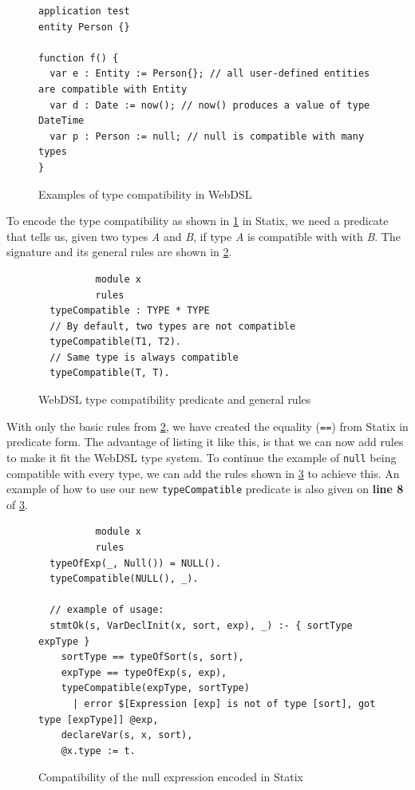       \begin{figure}
        \begin{verbatim}
application test
entity Person {}

function f() {
  var e : Entity := Person{}; // all user-defined entities are compatible with Entity
  var d : Date := now(); // now() produces a value of type DateTime
  var p : Person := null; // null is compatible with many types
}
        \end{verbatim}
        \caption{\label{fig:webdsl-basics-type-compatibility-example}Examples of type compatibility in WebDSL}
      \end{figure}

      To encode the type compatibility as shown in \cref{fig:webdsl-basics-type-compatibility-example} in Statix, we need a predicate that tells us, given two types \textit{A} and \textit{B}, if type \textit{A} is compatible with with \textit{B}. The signature and its general rules are shown in \cref{fig:type-compatibility-statix-basic}.

      \begin{figure}
        \begin{verbatim}
          module x
          rules
  typeCompatible : TYPE * TYPE
  // By default, two types are not compatible
  typeCompatible(T1, T2).
  // Same type is always compatible
  typeCompatible(T, T).
        \end{verbatim}
        \caption{\label{fig:type-compatibility-statix-basic}WebDSL type compatibility predicate and general rules}
      \end{figure}

      With only the basic rules from \cref{fig:type-compatibility-statix-basic}, we have created the equality (\texttt{==}) from Statix in predicate form. The advantage of listing it like this, is that we can now add rules to make it fit the WebDSL type system. To continue the example of \texttt{null} being compatible with every type, we can add the rules shown in \cref{fig:null-type-compatibility} to achieve this. An example of how to use our new \texttt{typeCompatible} predicate is also given on \textbf{line 8} of \cref{fig:null-type-compatibility}.

      \begin{figure}
        \begin{verbatim}
          module x
          rules
  typeOfExp(_, Null()) = NULL().
  typeCompatible(NULL(), _).

  // example of usage:
  stmtOk(s, VarDeclInit(x, sort, exp), _) :- { sortType expType }
    sortType == typeOfSort(s, sort),
    expType == typeOfExp(s, exp),
    typeCompatible(expType, sortType)
      | error $[Expression [exp] is not of type [sort], got type [expType]] @exp,
    declareVar(s, x, sort),
    @x.type := t.
        \end{verbatim}
        \caption{\label{fig:null-type-compatibility}Compatibility of the null expression encoded in Statix}
      \end{figure}

